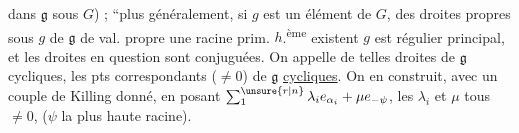dans $\mathfrak g$ sous $G$) ;  ``plus généralement, si $g$ est un élément  de $G$, des  droites propres sous $g$ de $\mathfrak g$ de val. propre une racine prim. $h$.\textsuperscript{ème} existent  $g$ est régulier principal, et les droites en question sont conjuguées. On  appelle de telles droites de $\mathfrak g$ cycliques, les pts correspondants ($\ne 0$) de $\mathfrak g$ \uline{cycliques}.  On en construit, avec un couple de Killing donné, en posant $\sum_{1}^{\unsure{r|n}}\lambda_i e_{\alpha_i}+\mu e_{-\psi}$, les $\lambda_i$ et $\mu$ tous $\ne 0$, ($\psi$ la plus haute racine). \unsure{$\Vert$}


